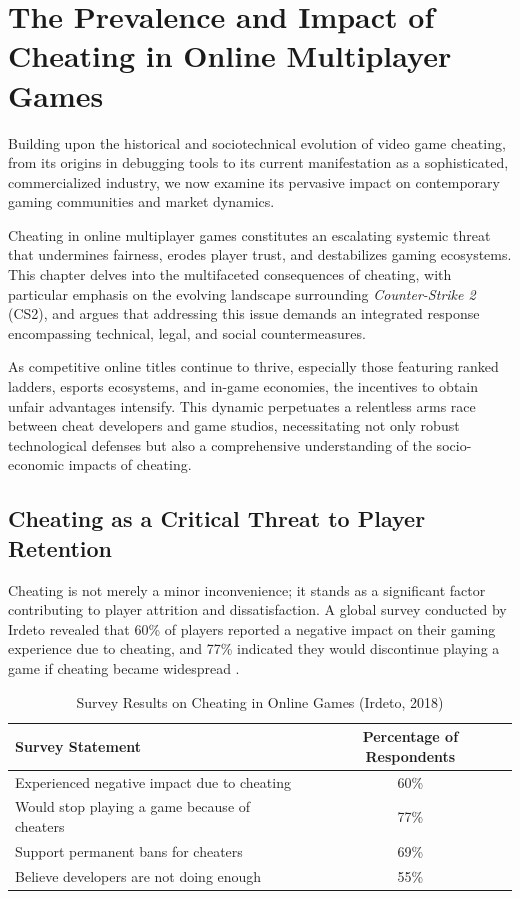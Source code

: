 \chapter{The Prevalence and Impact of Cheating in Online Multiplayer Games}

Building upon the historical and sociotechnical evolution of video game cheating, from its origins in debugging tools to its current manifestation as a sophisticated, commercialized industry, we now examine its pervasive impact on contemporary gaming communities and market dynamics.

Cheating in online multiplayer games constitutes an escalating systemic threat that undermines fairness, erodes player trust, and destabilizes gaming ecosystems. This chapter delves into the multifaceted consequences of cheating, with particular emphasis on the evolving landscape surrounding \textit{Counter-Strike 2} (CS2), and argues that addressing this issue demands an integrated response encompassing technical, legal, and social countermeasures.

As competitive online titles continue to thrive, especially those featuring ranked ladders, esports ecosystems, and in-game economies, the incentives to obtain unfair advantages intensify. This dynamic perpetuates a relentless arms race between cheat developers and game studios, necessitating not only robust technological defenses but also a comprehensive understanding of the socio-economic impacts of cheating.

\section{Cheating as a Critical Threat to Player Retention}

Cheating is not merely a minor inconvenience; it stands as a significant factor contributing to player attrition and dissatisfaction. A global survey conducted by Irdeto revealed that 60\% of players reported a negative impact on their gaming experience due to cheating, and 77\% indicated they would discontinue playing a game if cheating became widespread \parencite{irdeto2018global}.

\begin{table}[H]
  \centering
  \caption{Survey Results on Cheating in Online Games (Irdeto, 2018)}
  \label{tab:irdeto-survey}
  \begin{tabular}{|p{10cm}|c|}
  \hline
  \textbf{Survey Statement} & \textbf{Percentage of Respondents} \\
  \hline
  Experienced negative impact due to cheating & 60\% \\
  Would stop playing a game because of cheaters & 77\% \\
  Support permanent bans for cheaters & 69\% \\
  Believe developers are not doing enough & 55\% \\
  \hline
  \end{tabular}
\end{table}

